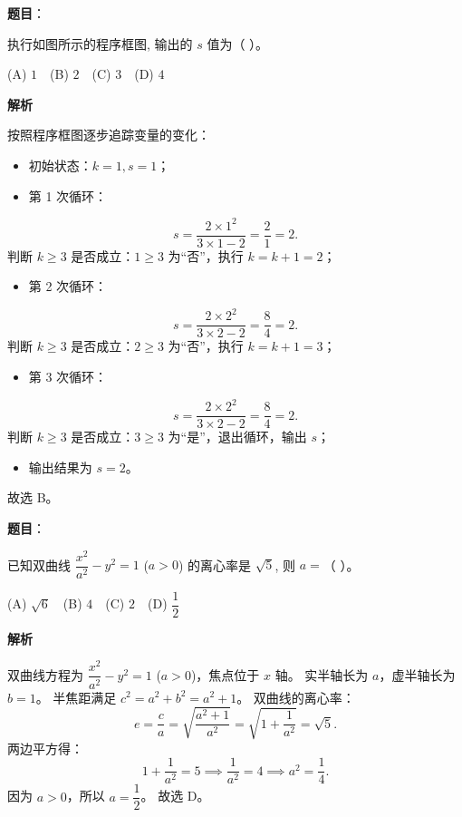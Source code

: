 \begin{answer}

\textbf{题目}：

执行如图所示的程序框图, 输出的 $s$ 值为（ ）。
\nopagebreak[4]
\begin{center}\end{center}
\nopagebreak[4]
(A) $1$　(B) $2$　(C) $3$　(D) $4$

\textbf{解析}

按照程序框图逐步追踪变量的变化：
\begin{itemize}
\item 初始状态：$k = 1, s = 1$；
\item 第 1 次循环：
\end{itemize}
\nopagebreak[4]
\[s = \dfrac{2 \times 1^2}{3 \times 1 - 2} = \dfrac{2}{1} = 2.\]
  判断 $k \geqslant 3$ 是否成立：$1 \geqslant 3$ 为“否”，执行 $k = k + 1 = 2$；
\begin{itemize}
\item 第 2 次循环：
\end{itemize}
\nopagebreak[4]
\[s = \dfrac{2 \times 2^2}{3 \times 2 - 2} = \dfrac{8}{4} = 2.\]
  判断 $k \geqslant 3$ 是否成立：$2 \geqslant 3$ 为“否”，执行 $k = k + 1 = 3$；
\begin{itemize}
\item 第 3 次循环：
\end{itemize}
\nopagebreak[4]
\[s = \dfrac{2 \times 2^2}{3 \times 2 - 2} = \dfrac{8}{4} = 2.\]
  判断 $k \geqslant 3$ 是否成立：$3 \geqslant 3$ 为“是”，退出循环，输出 $s$；
\begin{itemize}
\item 输出结果为 $s = 2$。
\end{itemize}
故选 B。


\end{answer}
\begin{answer}

\textbf{题目}：

已知双曲线 $\dfrac{x^2}{a^2} - y^2 = 1$ ($a > 0$) 的离心率是 $\sqrt{5}$, 则 $a =$（ ）。

(A) $\sqrt{6}$　(B) $4$　(C) $2$　(D) $\dfrac{1}{2}$

\textbf{解析}

双曲线方程为 $\dfrac{x^2}{a^2} - y^2 = 1$ ($a > 0$)，焦点位于 $x$ 轴。
实半轴长为 $a$，虚半轴长为 $b = 1$。
半焦距满足 $c^2 = a^2 + b^2 = a^2 + 1$。
双曲线的离心率：
\nopagebreak[4]
\[e = \dfrac{c}{a} = \sqrt{\dfrac{a^2 + 1}{a^2}} = \sqrt{1 + \dfrac{1}{a^2}} = \sqrt{5}.\]
两边平方得：
\nopagebreak[4]
\[1 + \dfrac{1}{a^2} = 5 \implies \dfrac{1}{a^2} = 4 \implies a^2 = \dfrac{1}{4}.\]
因为 $a > 0$，所以 $a = \dfrac{1}{2}$。
故选 D。


\end{answer}
